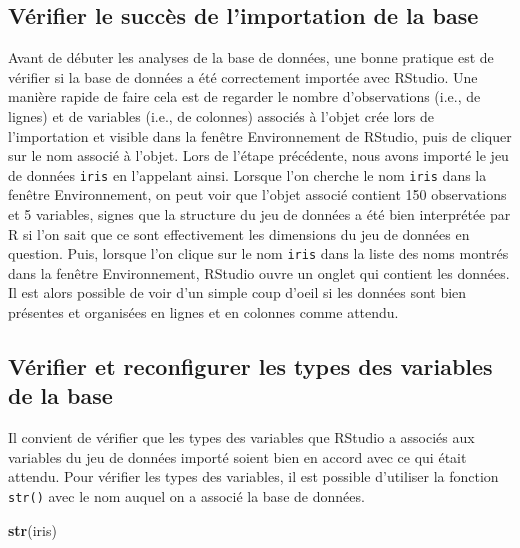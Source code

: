 \documentclass[
  french,
]{book}
\newenvironment{Shaded}{\begin{snugshade}}{\end{snugshade}}
\newcommand{\KeywordTok}[1]{\textcolor[rgb]{0.13,0.29,0.53}{\textbf{#1}}}
\newcommand{\NormalTok}[1]{#1}
\begin{document}
\hypertarget{vuxe9rifier-le-succuxe8s-de-limportation-de-la-base}{%
\subsection{Vérifier le succès de l'importation de la base}\label{vuxe9rifier-le-succuxe8s-de-limportation-de-la-base}}

Avant de débuter les analyses de la base de données, une bonne pratique est de vérifier si la base de données a été correctement importée avec RStudio. Une manière rapide de faire cela est de regarder le nombre d'observations (i.e., de lignes) et de variables (i.e., de colonnes) associés à l'objet crée lors de l'importation et visible dans la fenêtre Environnement de RStudio, puis de cliquer sur le nom associé à l'objet. Lors de l'étape précédente, nous avons importé le jeu de données \texttt{iris} en l'appelant ainsi. Lorsque l'on cherche le nom \texttt{iris} dans la fenêtre Environnement, on peut voir que l'objet associé contient 150 observations et 5 variables, signes que la structure du jeu de données a été bien interprétée par R si l'on sait que ce sont effectivement les dimensions du jeu de données en question. Puis, lorsque l'on clique sur le nom \texttt{iris} dans la liste des noms montrés dans la fenêtre Environnement, RStudio ouvre un onglet qui contient les données. Il est alors possible de voir d'un simple coup d'oeil si les données sont bien présentes et organisées en lignes et en colonnes comme attendu.

\hypertarget{vuxe9rifier-et-reconfigurer-les-types-des-variables-de-la-base}{%
\subsection{Vérifier et reconfigurer les types des variables de la base}\label{vuxe9rifier-et-reconfigurer-les-types-des-variables-de-la-base}}

Il convient de vérifier que les types des variables que RStudio a associés aux variables du jeu de données importé soient bien en accord avec ce qui était attendu. Pour vérifier les types des variables, il est possible d'utiliser la fonction \texttt{str()} avec le nom auquel on a associé la base de données.

\begin{Shaded}
\begin{Highlighting}[]
\KeywordTok{str}\NormalTok{(iris)}
\end{Highlighting}
\end{Shaded}
\end{document}
